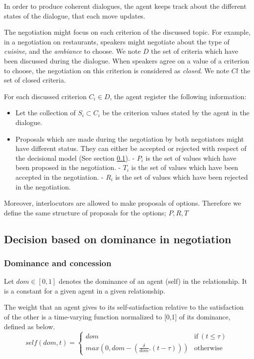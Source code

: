 \documentclass{llncs}
\begin{document}
				
				In order to produce coherent dialogues, the agent keeps track about the different states of the dialogue, that each move updates. 
				
				The negotiation might focus on each criterion of the discussed topic. For example, in a negotiation on restaurants, speakers might negotiate about the type of \textit{cuisine}, and the \textit{ambiance} to choose.  We note $D$ the set of criteria which have been discussed during the dialogue. When speakers agree on a value of a criterion to choose, the negotiation on this criterion is considered as \textit{closed}. We note $Cl$ the set of closed criteria.
				
				For each discussed criterion $C_i \in D$, the agent register the following information:		
				\begin{itemize}
					\item Let the collection of $S_i \subset C_i$ be the criterion values stated by the agent in the dialogue.
					\item Proposals which are made during the negotiation by both negotiators might have different status. They can either be accepted or rejected with respect of the decisional model (See section \ref{decision}).
					\subitem - $P_i$ is the set of  values which have been proposed in the negotiation.
					\subitem - $T_i$  is the set of values which have been accepted in the negotiation.
					\subitem - $R_i$  is the set of values which have been rejected in the negotiation.
				\end{itemize}
				
				Moreover, interlocutors are allowed to make proposals of options. Therefore we define the same structure of proposals for the options; $P, R, T$
				
				\subsection{Decision based on dominance in negotiation}
				\label{decision}
				\subsubsection {Dominance and concession}
				Let  $dom \in [0, 1] $ denotes the dominance of an agent (self) in the relationship.  It is a constant for a given agent in a given relationship.
				
				The weight that an agent gives to its self-satisfaction relative to	the satisfaction of the other is a time-varying function normalized to 	[0,1] of its dominance, defined as below.
				$$self(dom, t) = \left\{\begin{array}{ll}
				dom & \mathrm{if\ } (t \leq \tau)\\
				max(0, dom - (\frac{\delta}{dom} . (t - \tau))) & \mathrm{otherwise}
				\end{array}\right.$$
				
\end{document}
